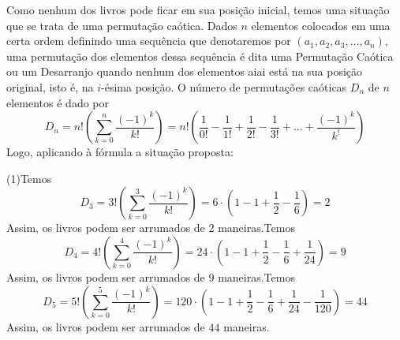 \documentclass[oneside,a4paper,12pt]{article}
\newcommand{\negrito}[1]{\mbox{\boldmath{$#1$}}}
\theoremstyle{Colorido}
\theoremstyle{solu}
\theoremstyle{dotlessP}
\begin{document}
{Como nenhum dos livros pode ficar em sua posição inicial, temos uma situação que se trata de uma permutação caótica. Dados $n$ elementos colocados em uma certa ordem definindo uma sequência que denotaremos por $(a_1,a_2,a_3, \ldots, a_n),$ uma permutação dos elementos dessa sequência é dita uma Permutação Caótica ou um Desarranjo quando nenhum dos elementos aiai está na sua posição original, isto é, na $i$-ésima posição. O número de permutações caóticas $D_n$ de $n$ elementos é dado por\[D_n = n! \left( \sum\limits_{k=0}^n \frac{(-1)^k}{k!}\right) = n! \left(\frac{1}{0!} - \frac{1}{1!} + \frac{1}{2!} - \frac{1}{3!} + \ldots + \frac{(-1)^k}{k^!}   \right)\]Logo, aplicando à fórmula a situação proposta:\begin{tasks}[counter-format={(tsk[a])},label-width=3.6ex, label-format = {\bfseries}, column-sep = {20pt}](1)\task[\textcolor{blue}{$\negrito{(a)} $}] Temos \[D_3 =  3! \left( \sum\limits_{k=0}^3  \frac{(-1)^k}{k!}\right) = 6 \cdot \left( 1 - 1 + \frac{1}{2} - \frac{1}{6} \right) = 2\]Assim, os livros podem ser arrumados de $2$ maneiras.\task[\textcolor{blue}{$\negrito{(b)} $}] Temos \[D_4 =  4! \left( \sum\limits_{k=0}^4  \frac{(-1)^k}{k!}\right) = 24 \cdot \left( 1 - 1 + \frac{1}{2} - \frac{1}{6} + \frac{1}{24} \right) = 9\]Assim, os livros podem ser arrumados de $9$ maneiras.\task[\textcolor{blue}{$\negrito{(c)} $}] Temos \[D_5 =  5! \left( \sum\limits_{k=0}^5  \frac{(-1)^k}{k!}\right) = 120 \cdot \left( 1 - 1 + \frac{1}{2} - \frac{1}{6} + \frac{1}{24} - \frac{1}{120} \right) = 44\]Assim, os livros podem ser arrumados de $44$ maneiras.\end{tasks}}
\end{document}

